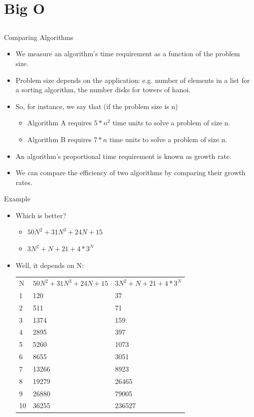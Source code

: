 \documentclass{beamer}
\begin{document}
\section{Big O}
\subsection{}

\begin{frame}{Comparing Algorithms}
\begin{itemize}
\item We measure an algorithm's time requirement as a function of the problem size.
\item Problem size depends on the application: e.g. number of elements in a list for a sorting algorithm, the number disks for towers of hanoi.
\item So, for instance, we say that (if the problem size is n)
\begin{itemize}
\item Algorithm A requires $5*n^2$ time units to solve a problem of size n.
\item Algorithm B requires $7*n$  time units to solve a problem of size n.
\end{itemize}
\item An algorithm's proportional time requirement is known as growth rate.
\item We can compare the efficiency of two algorithms by comparing their growth rates.
\end{itemize}
\end{frame}

\begin{frame}{Example}
\begin{itemize}
\item Which is better?
\begin{itemize}
\item $50N^2 + 31N^3 + 24N + 15$
\item $3N^2 + N + 21 + 4*3^N$
\end{itemize}
\item <2-> Well, it depends on N: \\
\begin{tabular}{l l l}
N  & $50N^2 + 31N^3 + 24N + 15$ & $3N^2 + N + 21 + 4*3^N$ \\
1   &       120     &           37 \\
2   &       511     &           71 \\
3   &      1374     &          159 \\
4   &      2895     &          397 \\
5   &      5260     &         1073 \\
6   &      8655     &         3051 \\
7   &     13266     &         8923 \\
8   &     19279     &        26465 \\
9   &     26880     &        79005 \\
10  &     36255     &       236527 \\
\end{tabular}
\end{itemize}
\end{frame}
\end{document}
